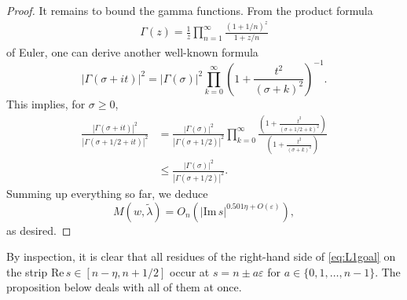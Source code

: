 \documentclass[11pt]{amsart}
\numberwithin{theorem}{section}
\numberwithin{equation}{section}
\theoremstyle{remark}
\theoremstyle{definition}
\newcommand{\re}{\mathrm{Re}\,}
\newcommand{\im}{\mathrm{Im}\,}
\begin{document}
\begin{proof}
It remains to bound the gamma functions. From the product formula
\begin{align*}
\Gamma(z) = \frac{1}{z}\prod_{n=1}^\infty\frac{(1+1/n)^z}{1+z/n}
\end{align*}
of Euler, one can derive another well-known formula
\begin{equation*}
|\Gamma(\sigma + it)|^2 = |\Gamma(\sigma)|^2\prod_{k=0}^\infty\left(1+\frac{t^2}{(\sigma+k)^2}\right)^{-1}.
\end{equation*}
This implies, for $\sigma \geq 0$,
\begin{align*}
\frac{|\Gamma(\sigma+it)|^2}{|\Gamma(\sigma+1/2+it)|^2} &= \frac{|\Gamma(\sigma)|^2}{|\Gamma(\sigma+1/2)|^2}\prod_{k=0}^\infty \frac{\left(1+\frac{t^2}{(\sigma+1/2+k)^2}\right)}{\left(1+\frac{t^2}{(\sigma+k)^2}\right)} \\
& \leq \frac{|\Gamma(\sigma)|^2}{|\Gamma(\sigma+1/2)|^2}.
\end{align*}
Summing up everything so far, we deduce
\begin{equation*}
M(w,\tilde\lambda) = O_n(|\im s|^{0.501\eta+O(\varepsilon)}),
\end{equation*}
as desired.
\end{proof}


By inspection, it is clear that all residues of the right-hand side of \eqref{eq:L1goal} on the strip $\re s \in [n-\eta,n+1/2]$ occur at $s=n\pm a\varepsilon$ for $a \in \{0,1,\ldots,n-1\}$.
The proposition below deals with all of them at once.
\end{document}
